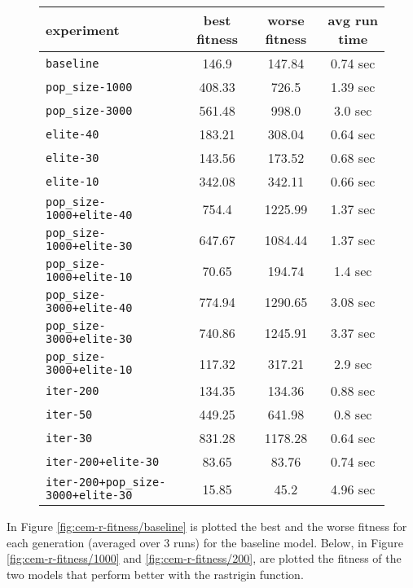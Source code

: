 \begin{figure}[htb]
	\centering
	
	\begin{tabular}{lccc}
		\toprule
		\textbf{experiment} & \textbf{best fitness} & \textbf{worse fitness} & \textbf{avg run time} \\
		\midrule
		\texttt{baseline 						}		 &	 146.9 &	 147.84 &	  0.74 sec \\
		\texttt{pop\_size-1000 					}			   &	408.33 &	  726.5 &	  1.39 sec \\
		\texttt{pop\_size-3000 					}			   &	561.48 &	  998.0 &	   3.0 sec \\
		\texttt{elite-40 						}		 &	183.21 &	 308.04 &	  0.64 sec \\
		\texttt{elite-30 						}		 &	143.56 &	 173.52 &	  0.68 sec \\
		\texttt{elite-10 						}		 &	342.08 &	 342.11 &	  0.66 sec \\
		\texttt{pop\_size-1000+elite-40 		}	  &	 754.4 &	1225.99 &	  1.37 sec \\
		\texttt{pop\_size-1000+elite-30 		}	  &	647.67 &	1084.44 &	  1.37 sec \\
		\texttt{pop\_size-1000+elite-10 		}	  &	 70.65 &	 194.74 &	   1.4 sec \\
		\texttt{pop\_size-3000+elite-40 		}	  &	774.94 &	1290.65 &	  3.08 sec \\
		\texttt{pop\_size-3000+elite-30 		}	  &	740.86 &	1245.91 &	  3.37 sec \\
		\texttt{pop\_size-3000+elite-10 		}	  &	117.32 &	 317.21 &	   2.9 sec \\
		\texttt{iter-200 						}	 &	134.35 &	 134.36 &	  0.88 sec \\
		\texttt{iter-50 						}	  &	449.25 &	 641.98 &	   0.8 sec \\
		\texttt{iter-30 						}	  &	831.28 &	1178.28 &	  0.64 sec \\
		\texttt{iter-200+elite-30 				}	 &	 83.65 &	  83.76 &	  0.74 sec \\
		\texttt{iter-200+pop\_size-3000+elite-30} 	&	 15.85 &	   45.2 &	  4.96 sec \\
		\bottomrule
	\end{tabular}
	\label{tab:cem-performance-r}
\end{figure}


In Figure \ref{fig:cem-r-fitness/baseline} is plotted the best and the worse fitness for each generation (averaged over 3 runs) for the baseline model. Below, in Figure \ref{fig:cem-r-fitness/1000} and \ref{fig:cem-r-fitness/200}, are plotted the fitness of the two models that perform better with the rastrigin function.

